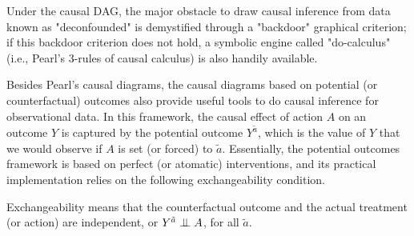 Under the causal DAG,  
the major obstacle to draw causal inference from data known as "deconfounded" is demystified through a "backdoor" graphical criterion; if this backdoor criterion does not hold, a symbolic engine called "do-calculus" (i.e., Pearl's 3-rules of causal calculus)  is also handily available.






Besides Pearl's causal diagrams, the causal diagrams based on potential (or counterfactual) outcomes also provide useful tools to do causal inference for 
observational data.
In this framework, the causal effect of action $A$ on an outcome $Y$ is captured by 
the potential outcome $Y^{\tilde{a}}$, which is the value of $Y$ that we would observe if $A$ is set (or forced) to $\tilde{a}$.  Essentially, the potential outcomes framework 
is based on perfect (or atomatic) interventions, and its practical implementation relies on the following exchangeability condition.

\begin{Def}[Exchangeability]
	Exchangeability means that the counterfactual outcome and the actual treatment (or action) are independent, or $Y^{\tilde{a}} \perp\mkern-9.5mu\perp A$, for all $\tilde{a}$.
\end{Def}


 



